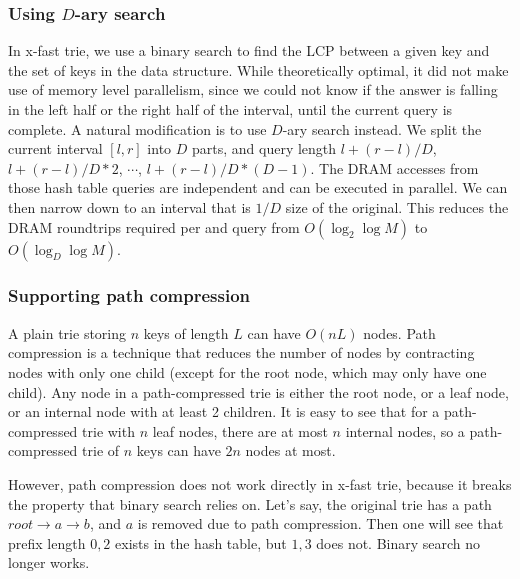 \documentclass[11pt, usletter]{article}
\begin{document}
\subsubsection*{Using $D$-ary search}

In x-fast trie, we use a binary search to find the LCP between a given key and the set of keys in the data structure.
While theoretically optimal, it did not make use of memory level parallelism, 
since we could not know if the answer is falling in the left half or the right half of the interval, 
until the current query is complete. 
A natural modification is to use $D$-ary search instead. 
We split the current interval $[l,r]$ into $D$ parts, 
and query length $l+(r-l)/D$, $l+(r-l)/D*2$, $\cdots$, $l+(r-l)/D*(D-1)$.
The DRAM accesses from those hash table queries are independent and can be executed in parallel.
We can then narrow down to an interval that is $1/D$ size of the original.
This reduces the DRAM roundtrips required per \lookup and \lowerbound query from $O(\log_2\log M)$ to $O(\log_D\log M)$.

\subsubsection*{Supporting path compression}

A plain trie storing $n$ keys of length $L$ can have $O(nL)$ nodes.
Path compression is a technique that reduces the number of nodes by contracting nodes with only one child 
(except for the root node, which may only have one child). 
Any node in a path-compressed trie is either the root node, or a leaf node, or an internal node with at least 2 children. 
It is easy to see that for a path-compressed trie with $n$ leaf nodes, there are at most $n$ internal nodes, 
so a path-compressed trie of $n$ keys can have $2n$ nodes at most.

However, path compression does not work directly in x-fast trie, 
because it breaks the property that binary search relies on. 
Let's say, the original trie has a path $root\rightarrow a\rightarrow b$, 
and $a$ is removed due to path compression. 
Then one will see that prefix length $0,2$ exists in the hash table, 
but $1,3$ does not. Binary search no longer works.
\end{document}

